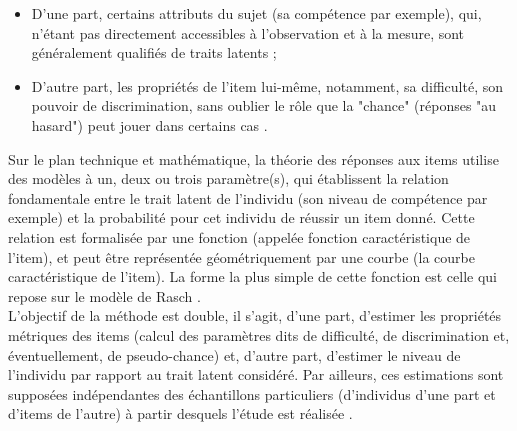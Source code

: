 \begin{itemize}
	\item D’une part, certains attributs du sujet (sa compétence par exemple), qui, n'étant pas directement accessibles à l'observation et à la mesure, sont généralement qualifiés de traits latents \cite{xcv_wiki} ;
	\item D’autre part, les propriétés de l'item lui-même, notamment, sa difficulté, son pouvoir de discrimination, sans oublier le rôle que la "chance" (réponses "au hasard") peut jouer dans certains cas \cite{xcv_wiki}.
\end{itemize}

Sur le plan technique et mathématique, la théorie des réponses aux items utilise des modèles à un, deux ou trois paramètre(s), qui établissent la relation fondamentale entre le trait latent de l'individu (son niveau de compétence par exemple) et la probabilité pour cet individu de réussir un item donné. Cette relation est formalisée par une fonction (appelée fonction caractéristique de l'item), et peut être représentée géométriquement par une courbe (la courbe caractéristique de l'item). La forme la plus simple de cette fonction est celle qui repose sur le modèle de Rasch \cite{xcv_wiki}.\\
L'objectif de la méthode est double, il s'agit, d'une part, d'estimer les propriétés métriques des items (calcul des paramètres dits de difficulté, de discrimination et, éventuellement, de pseudo-chance) et, d'autre part, d'estimer le niveau de l'individu par rapport au trait latent considéré. Par ailleurs, ces estimations sont supposées indépendantes des échantillons particuliers (d'individus d'une part et d'items de l'autre) à partir desquels l'étude est réalisée \cite{xcv_wiki}.

